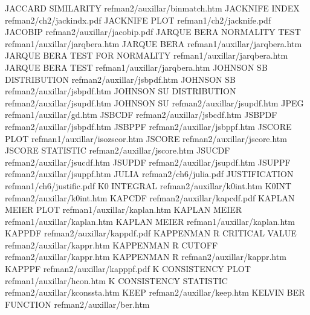 JACCARD SIMILARITY                      refman2/auxillar/binmatch.htm
JACKNIFE INDEX                          refman2/ch2/jackindx.pdf
JACKNIFE PLOT                           refman1/ch2/jacknife.pdf
JACOBIP                                 refman2/auxillar/jacobip.pdf
JARQUE BERA NORMALITY TEST              refman1/auxillar/jarqbera.htm
JARQUE BERA                             refman1/auxillar/jarqbera.htm
JARQUE BERA TEST FOR NORMALITY          refman1/auxillar/jarqbera.htm
JARQUE BERA TEST                        refman1/auxillar/jarqbera.htm
JOHNSON SB DISTRIBUTION                 refman2/auxillar/jsbpdf.htm
JOHNSON SB                              refman2/auxillar/jsbpdf.htm
JOHNSON SU DISTRIBUTION                 refman2/auxillar/jsupdf.htm
JOHNSON SU                              refman2/auxillar/jsupdf.htm
JPEG                                    refman1/auxillar/gd.htm
JSBCDF                                  refman2/auxillar/jsbcdf.htm
JSBPDF                                  refman2/auxillar/jsbpdf.htm
JSBPPF                                  refman2/auxillar/jsbppf.htm
JSCORE PLOT                             refman1/auxillar/isozscor.htm
JSCORE                                  refman2/auxillar/jscore.htm
JSCORE STATISTIC                        refman2/auxillar/jscore.htm
JSUCDF                                  refman2/auxillar/jsucdf.htm
JSUPDF                                  refman2/auxillar/jsupdf.htm
JSUPPF                                  refman2/auxillar/jsuppf.htm
JULIA                                   refman2/ch6/julia.pdf
JUSTIFICATION                           refman1/ch6/justific.pdf
K0 INTEGRAL                             refman2/auxillar/k0int.htm
K0INT                                   refman2/auxillar/k0int.htm
KAPCDF                                  refman2/auxillar/kapcdf.pdf
KAPLAN MEIER PLOT                       refman1/auxillar/kaplan.htm
KAPLAN MEIER                            refman1/auxillar/kaplan.htm
KAPLAN MEIER                            refman1/auxillar/kaplan.htm
KAPPDF                                  refman2/auxillar/kappdf.pdf
KAPPENMAN R CRITICAL VALUE              refman2/auxillar/kappr.htm
KAPPENMAN R CUTOFF                      refman2/auxillar/kappr.htm
KAPPENMAN R                             refman2/auxillar/kappr.htm
KAPPPF                                  refman2/auxillar/kapppf.pdf
K CONSISTENCY PLOT                      refman1/auxillar/hcon.htm
K CONSISTENCY STATISTIC                 refman2/auxillar/kconssta.htm
KEEP                                    refman2/auxillar/keep.htm
KELVIN BER FUNCTION                     refman2/auxillar/ber.htm
